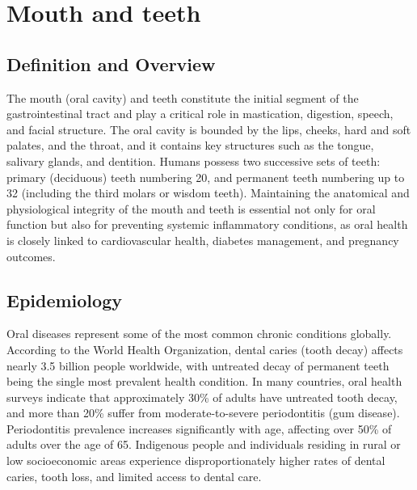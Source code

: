 \chapter{Mouth and teeth}

\section*{Definition and Overview}
The mouth (oral cavity) and teeth constitute the initial segment of the gastrointestinal tract and play a critical role in mastication, digestion, speech, and facial structure. The oral cavity is bounded by the lips, cheeks, hard and soft palates, and the throat, and it contains key structures such as the tongue, salivary glands, and dentition. Humans possess two successive sets of teeth: primary (deciduous) teeth numbering 20, and permanent teeth numbering up to 32 (including the third molars or wisdom teeth). Maintaining the anatomical and physiological integrity of the mouth and teeth is essential not only for oral function but also for preventing systemic inflammatory conditions, as oral health is closely linked to cardiovascular health, diabetes management, and pregnancy outcomes.

\section*{Epidemiology}
Oral diseases represent some of the most common chronic conditions globally. According to the World Health Organization, dental caries (tooth decay) affects nearly 3.5 billion people worldwide, with untreated decay of permanent teeth being the single most prevalent health condition. In many countries, oral health surveys indicate that approximately 30\% of adults have untreated tooth decay, and more than 20\% suffer from moderate-to-severe periodontitis (gum disease). Periodontitis prevalence increases significantly with age, affecting over 50\% of adults over the age of 65. Indigenous people and individuals residing in rural or low socioeconomic areas experience disproportionately higher rates of dental caries, tooth loss, and limited access to dental care.

